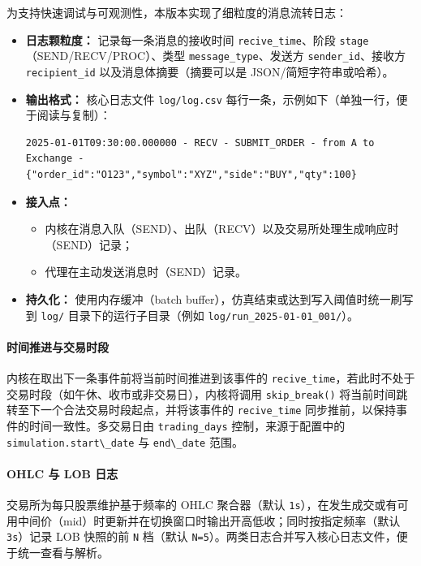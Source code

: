 为支持快速调试与可观测性，本版本实现了细粒度的消息流转日志：

\begin{itemize}
  \item \textbf{日志颗粒度：}
    记录每一条消息的接收时间 \texttt{recive\_time}、阶段 \texttt{stage}（SEND/RECV/PROC）、类型 \texttt{message\_type}、发送方 \texttt{sender\_id}、接收方 \texttt{recipient\_id} 以及消息体摘要（摘要可以是 JSON/简短字符串或哈希）。
  \item \textbf{输出格式：}
    核心日志文件 \texttt{log/log.csv} 每行一条，示例如下（单独一行，便于阅读与复制）：
\begin{verbatim}
2025-01-01T09:30:00.000000 - RECV - SUBMIT_ORDER - from A to Exchange - {"order_id":"O123","symbol":"XYZ","side":"BUY","qty":100}
\end{verbatim}
  \item \textbf{接入点：}
    \begin{itemize}
      \item 内核在消息入队（SEND）、出队（RECV）以及交易所处理生成响应时（SEND）记录；
      \item 代理在主动发送消息时（SEND）记录。
    \end{itemize}
  \item \textbf{持久化：}
    使用内存缓冲（batch buffer），仿真结束或达到写入阈值时统一刷写到 \texttt{log/} 目录下的运行子目录（例如 \texttt{log/run\_2025-01-01\_001/}）。
\end{itemize}

\paragraph{时间推进与交易时段}
内核在取出下一条事件前将当前时间推进到该事件的 \verb|recive_time|，若此时不处于交易时段（如午休、收市或非交易日），内核将调用 \verb|skip_break()| 将当前时间跳转至下一个合法交易时段起点，并将该事件的 \verb|recive_time| 同步推前，以保持事件的时间一致性。多交易日由 \verb|trading_days| 控制，来源于配置中的 \verb|simulation.start\_date| 与 \verb|end\_date| 范围。

\paragraph{OHLC 与 LOB 日志}
交易所为每只股票维护基于频率的 OHLC 聚合器（默认 \verb|1s|），在发生成交或有可用中间价（mid）时更新并在切换窗口时输出开高低收；同时按指定频率（默认 \verb|3s|）记录 LOB 快照的前 \verb|N| 档（默认 \verb|N=5|）。两类日志合并写入核心日志文件，便于统一查看与解析。

